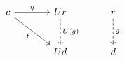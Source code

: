 \documentclass[border=6pt]{standalone}
\begin{document}
$
\begin{tikzcd}[column sep=large, row sep=large]
  c \arrow[r, "\eta"] \arrow[dr, "f"'] & Ur \arrow[d, "U(g)", dashed] & r \arrow[d, "g", dashed] \\
   & Ud & d
\end{tikzcd}
$
\end{document}
